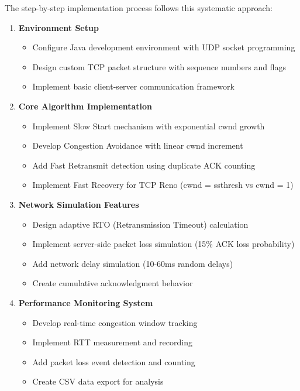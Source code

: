 \documentclass[12pt]{article}
\begin{document}
The step-by-step implementation process follows this systematic approach:

\begin{enumerate}
    \item \textbf{Environment Setup}
    \begin{itemize}
        \item Configure Java development environment with UDP socket programming
        \item Design custom TCP packet structure with sequence numbers and flags
        \item Implement basic client-server communication framework
    \end{itemize}
    
    \item \textbf{Core Algorithm Implementation}
    \begin{itemize}
        \item Implement Slow Start mechanism with exponential cwnd growth
        \item Develop Congestion Avoidance with linear cwnd increment
        \item Add Fast Retransmit detection using duplicate ACK counting
        \item Implement Fast Recovery for TCP Reno (cwnd = ssthresh vs cwnd = 1)
    \end{itemize}
    
    \item \textbf{Network Simulation Features}
    \begin{itemize}
        \item Design adaptive RTO (Retransmission Timeout) calculation
        \item Implement server-side packet loss simulation (15\% ACK loss probability)
        \item Add network delay simulation (10-60ms random delays)
        \item Create cumulative acknowledgment behavior
    \end{itemize}
    
    \item \textbf{Performance Monitoring System}
    \begin{itemize}
        \item Develop real-time congestion window tracking
        \item Implement RTT measurement and recording
        \item Add packet loss event detection and counting
        \item Create CSV data export for analysis
    \end{itemize}
    

\end{enumerate}
\end{document}
